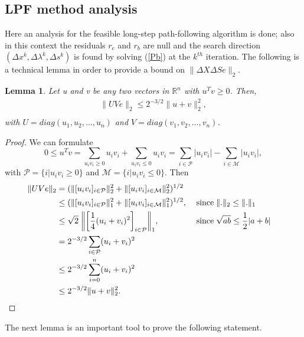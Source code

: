 \documentclass[a4paper,10 pt,titlepage,twoside]{report}
\theoremstyle{plain}
\newtheorem{lem}[thm]{Lemma}
\theoremstyle{definition}
\theoremstyle{remark}
\begin{document}
\subsection{LPF method analysis}
Here an analysis for the feasible long-step path-following algorithm is done; also in this context the residuals $r_{c}$ and $r_{b}$ are null and the search direction $(\Delta x^{k}, \Delta \lambda^{k}, \Delta s^{k})$ is found by solving (\ref{Pb}) at the $k^{th}$ iteration.
The following is a technical lemma in order to provide a bound on $\lVert\Delta X\Delta S e\rVert_{2}$.
\begin{lem}\label{lem1}
	Let u and v be any two vectors in $\mathbb{R}^{n}$ with $u^{T}v \geq 0$. Then, 
	\begin{align*}
	\lVert UVe \rVert_{2}\leq 2^{-3/2}\lVert u + v \rVert^{2}_{2},\\
	\end{align*}
	with $U = diag(u_{1}, u_{2}, ..., u_{n})$ and $V = diag(v_{1}, v_{2}, ..., v_{n})$. 
\end{lem}
\begin{proof}
	We can formulate
	\begin{equation*} 
	0 \leq u^{T}v = \sum\limits_{u_{i}v_{i} \geq 0}u_{i}v_{i} + \sum\limits_{u_{i}v_{i} \leq 0}u_{i}v_{i} = \sum\limits_{i \in \mathcal{P}}|u_{i}v_{i}| - \sum\limits_{i \in \mathcal{M}}|u_{i}v_{i}|, \end{equation*} with $\mathcal{P}= \{i | u_{i}v_{i} \geq 0\}$ and $\mathcal{M}= \{i | u_{i}v_{i} \leq 0\}$.
	Then
	\begin{align*}
	\lVert UVe \rVert_{2} &= ( \lVert[u_{i}v_{i}]_{i \in \mathcal{P}} \rVert^{2}_{2} +  \lVert[u_{i}v_{i}]_{i \in \mathcal{M}} \rVert^{2}_{2})^{1/2}\\
	&\leq ( \lVert[u_{i}v_{i}]_{i \in \mathcal{P}} \rVert^{2}_{1} +  \lVert[u_{i}v_{i}]_{i \in \mathcal{M}} \rVert^{2}_{1})^{1/2},\; &&\text{since\;} \lVert.\rVert_{2} \leq \lVert.\rVert_{1}\\
	&\leq\sqrt{2}\;\bigg\lVert\bigg[\frac{1}{4}(u_{i} + v_{i})^{2}\bigg]_{i\in \mathcal{P}}\bigg\rVert_{1}, &&\text{since\;} \sqrt{ab} \leq \frac{1}{2}|a+b|\\
	& = 2^{-3/2} \sum\limits_{i \in \mathcal{P}}(u_{i} + v_{i})^{2}\\
	& \leq 2^{-3/2} \sum\limits_{i = 0}^{n}(u_{i} + v_{i})^{2}\\
	& \leq 2^{-3/2} \lVert u + v \rVert^{2}_{2}.
	\end{align*}
\end{proof}	
The next lemma is an important tool to prove the following statement.
\end{document}
